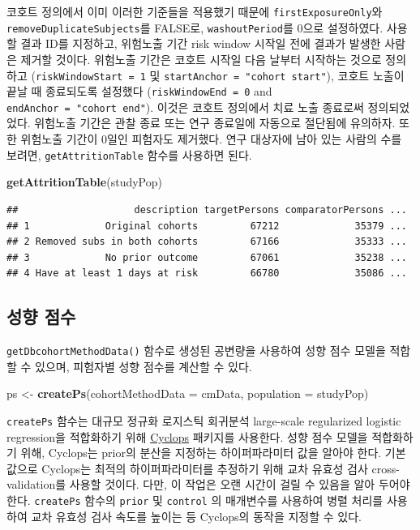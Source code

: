 \documentclass[11pt]{book}
\newenvironment{Shaded}{\begin{snugshade}}{\end{snugshade}}
\newcommand{\KeywordTok}[1]{\textcolor[rgb]{0.13,0.29,0.53}{\textbf{#1}}}
\newcommand{\DataTypeTok}[1]{\textcolor[rgb]{0.13,0.29,0.53}{#1}}
\newcommand{\StringTok}[1]{\textcolor[rgb]{0.31,0.60,0.02}{#1}}
\newcommand{\NormalTok}[1]{#1}
\theoremstyle{definition}
\theoremstyle{definition}
\theoremstyle{definition}
\theoremstyle{remark}
\begin{document}
코호트 정의에서 이미 이러한 기준들을 적용했기 때문에
\texttt{firstExposureOnly}와 \texttt{removeDuplicateSubjects}를 FALSE로,
\texttt{washoutPeriod}를 0으로 설정하였다. 사용할 결과 ID를 지정하고,
위험노출 기간 risk window 시작일 전에 결과가 발생한 사람은 제거할
것이다. 위험노출 기간은 코호트 시작일 다음 날부터 시작하는 것으로
정의하고 (\texttt{riskWindowStart\ =\ 1} 및
\texttt{startAnchor\ =\ "cohort\ start"}), 코호트 노출이 끝날 때
종료되도록 설정했다 (\texttt{riskWindowEnd\ =\ 0} and
\texttt{endAnchor\ =\ "cohort\ end"}). 이것은 코호트 정의에서 치료 노출
종료로써 정의되었었다. 위험노출 기간은 관찰 종료 또는 연구 종료일에
자동으로 절단됨에 유의하자. 또한 위험노출 기간이 0일인 피험자도
제거했다. 연구 대상자에 남아 있는 사람의 수를 보려면,
\texttt{getAttritionTable} 함수를 사용하면 된다.

\begin{Shaded}
\begin{Highlighting}[]
\KeywordTok{getAttritionTable}\NormalTok{(studyPop)}
\end{Highlighting}
\end{Shaded}

\begin{verbatim}
##                    description targetPersons comparatorPersons ...
## 1             Original cohorts         67212             35379 ...
## 2 Removed subs in both cohorts         67166             35333 ...
## 3             No prior outcome         67061             35238 ...
## 4 Have at least 1 days at risk         66780             35086 ...
\end{verbatim}

\subsection{성향 점수}\label{--1}

\texttt{getDbcohortMethodData()} 함수로 생성된 공변량을 사용하여 성향
점수 모델을 적합할 수 있으며, 피험자별 성향 점수를 계산할 수 있다.

\begin{Shaded}
\begin{Highlighting}[]
\NormalTok{ps <-}\StringTok{ }\KeywordTok{createPs}\NormalTok{(}\DataTypeTok{cohortMethodData =}\NormalTok{ cmData, }\DataTypeTok{population =}\NormalTok{ studyPop)}
\end{Highlighting}
\end{Shaded}

\texttt{createPs} 함수는 대규모 정규화 로지스틱 회귀분석 large-scale
regularized logistic regression을 적합화하기 위해
\href{https://ohdsi.github.io/Cyclops/}{Cyclops} 패키지를 사용한다. 성향
점수 모델을 적합화하기 위해, Cyclops는 prior의 분산을 지정하는
하이퍼파라미터 값을 알아야 한다. 기본 값으로 Cyclops는 최적의
하이퍼파라미터를 추정하기 위해 교차 유효성 검사 cross-validation를
사용할 것이다. 다만, 이 작업은 오랜 시간이 걸릴 수 있음을 알아 두어야
한다. \texttt{createPs} 함수의 \texttt{prior} 및 \texttt{control} 의
매개변수를 사용하여 병렬 처리를 사용하여 교차 유효성 검사 속도를 높이는
등 Cyclops의 동작을 지정할 수 있다.
\end{document}

